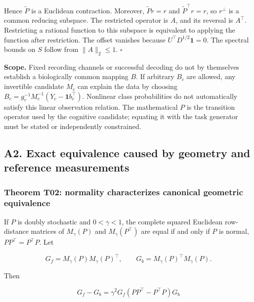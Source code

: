 \documentclass[11pt,a4paper]{article}
\begin{document}
Hence \(\widetilde P\) is a Euclidean contraction. Moreover,
\(\widetilde P r=r\) and \(\widetilde P^\top r=r\), so \(r^\perp\) is a
common reducing subspace. The restricted operator is \(A\), and its
reversal is \(A^\top\). Restricting a rational function to this subspace
is equivalent to applying the function after restriction. The offset
vanishes because \(U^\top D^{1/2}\mathbf1=0\). The spectral bounds on
\(S\) follow from \(\|A\|_2\le1\). \(\square\)

\textbf{Scope.} Fixed recording channels or successful decoding do not
by themselves establish a biologically common mapping \(B\). If
arbitrary \(B_c\) are allowed, any invertible candidate \(M_c\) can
explain the data by choosing
\(B_c=g_c^{-1}M_c^{-1}(Y_c-\mathbf1b_c^\top)\). Nonlinear class
probabilities do not automatically satisfy this linear observation
relation. The mathematical \(P\) is the transition operator used by the
cognitive candidate; equating it with the task generator must be stated
or independently constrained.

\subsection{A2. Exact equivalence caused by geometry and reference
measurements}\label{a2.-exact-equivalence-caused-by-geometry-and-reference-measurements}

\subsubsection{Theorem T02: normality characterizes canonical geometric
equivalence}\label{theorem-t02-normality-characterizes-canonical-geometric-equivalence}

\par
\noindent\begin{minipage}{\linewidth}

If \(P\) is doubly stochastic and \(0<\gamma<1\), the complete squared
Euclidean row-distance matrices of \(M_\gamma(P)\) and
\(M_\gamma(P^\top)\) are equal if and only if \(P\) is normal,
\(PP^\top=P^\top P\). Let

\[
G_f=M_\gamma(P)M_\gamma(P)^\top,\qquad
G_b=M_\gamma(P)^\top M_\gamma(P).
\]

\end{minipage}\par

\par
\noindent\begin{minipage}{\linewidth}

Then

\[
G_f-G_b=\gamma^2G_f(PP^\top-P^\top P)G_b
\]

\end{minipage}\par
\end{document}
